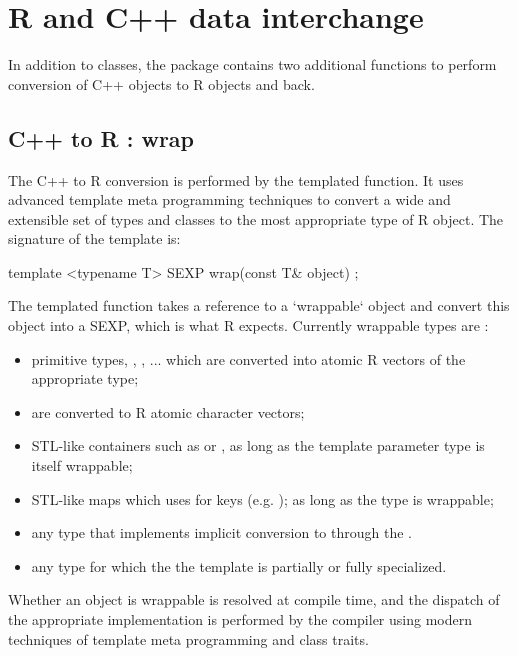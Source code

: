 \section{R and C++ data interchange}

In addition to classes, the  package contains two additional
functions to perform conversion of C++ objects to R objects and back. 

\subsection{C++ to R : wrap}

The C++ to R conversion is performed by the  templated 
function. It uses advanced template meta programming techniques
to convert a wide and extensible set of types and classes to the
most appropriate type of R object. The signature of the 
template is:

\begin{example}
template <typename T> 
SEXP wrap(const T& object) ;
\end{example}

The templated function takes a reference to a `wrappable` 
object and convert this object into a SEXP, which is what R expects. 
Currently wrappable types are :
\begin{itemize}
\item primitive types, , , ... which are converted 
into atomic R vectors of the appropriate type;
\item {} are converted to R atomic character vectors;
\item STL-like containers such as  or , 
as long as the template parameter type  is itself wrappable;
\item STL-like maps which uses  for keys 
(e.g. ); as long as 
the type  is wrappable;
\item any type that implements implicit conversion to  through the 
.
\item any type for which the the  template is partially or fully 
specialized.
\end{itemize}

Whether an object is wrappable is resolved at compile time, and the 
dispatch of the appropriate implementation is performed by the compiler
using modern techniques of template meta programming and class traits.

